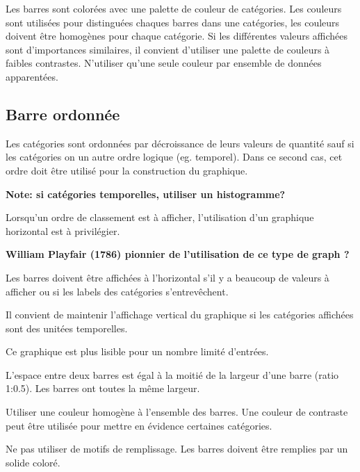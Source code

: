 \documentclass[a4paper,12pt]{article}
\begin{document}
\begin{multicols}{2}
Les barres sont colorées avec une palette de couleur de catégories. Les couleurs sont utilisées pour distinguées chaques barres dans une catégories, les couleurs doivent être homogènes pour chaque catégorie. Si les différentes valeurs affichées sont d'importances similaires, il convient d'utiliser une palette de couleurs à faibles contrastes. N'utiliser qu'une seule couleur par ensemble de données apparentées. \autocite{stephenfewComponentlevelGraphDesign2012}
\subsection*{Barre ordonnée}
\label{sec:orge91c2ce}
Les catégories sont ordonnées par décroissance de leurs valeurs de quantité\autocite{jonathanschwabishComparingCategories2021} sauf si les catégories on un autre ordre logique (eg. temporel). Dans ce second cas, cet ordre doit être utilisé pour la construction du graphique. \autocite{wilkeVisualizingAmounts2019}

\textbf{Note: si catégories temporelles, utiliser un histogramme?}

Lorsqu'un ordre de classement est à afficher, l'utilisation d'un graphique horizontal est à privilégier. \autocite{andreaskrauseBestPracticesData2024}

\textbf{William Playfair (1786) pionnier de l'utilisation de ce type de graph ?}

Les barres doivent être affichées à l'horizontal s'il y a beaucoup de valeurs à afficher ou si les labels des catégories s'entrevêchent. \autocite{alansmithLexiqueVisuel,sosulskiGraphics2019,wilkeVisualizingAmounts2019,stephenfewComponentlevelGraphDesign2012,jonathanschwabishComparingCategories2021}

Il convient de maintenir l'affichage vertical du graphique si les catégories affichées sont des unitées temporelles. \autocite{stephenfewComponentlevelGraphDesign2012}

Ce graphique est plus lisible pour un nombre limité d'entrées. \autocite{mikeyiHowChooseRight2020}

L'espace entre deux barres est égal à la moitié de la largeur d'une barre (ratio 1:0.5). Les barres ont toutes la même largeur. \autocite{stephenfewComponentlevelGraphDesign2012}

Utiliser une couleur homogène à l'ensemble des barres. Une couleur de contraste peut être utilisée pour mettre en évidence certaines catégories.

Ne pas utiliser de motifs de remplissage. Les barres doivent être remplies par un solide coloré. \autocite{stephenfewComponentlevelGraphDesign2012}


\end{multicols}
\end{document}

